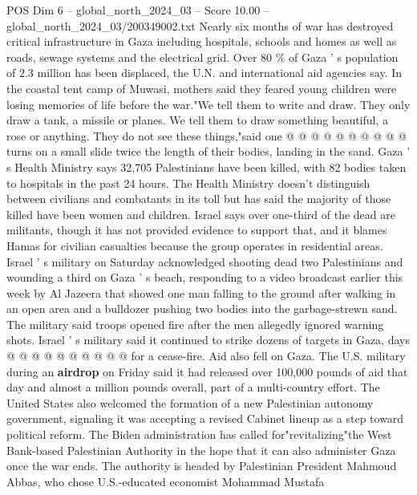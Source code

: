 \begin{textsample}{POS Dim 6 – global\_north\_2024\_03 – Score 10.00 – global\_north\_2024\_03/200349002.txt}
Nearly six months of war has destroyed critical infrastructure in Gaza including hospitals, schools and homes as well as roads, sewage systems and the electrical grid.
Over 80 \% of Gaza ' s population of 2.3 million has been displaced, the U.N. and international aid agencies say.
In the coastal tent camp of Muwasi, mothers said they feared young children were losing memories of life before the war."We tell them to write and draw.
They only draw a tank, a missile or planes.
We tell them to draw something beautiful, a rose or anything.
They do not see these things,"said one @ @ @ @ @ @ @ @ @ @ turns on a small slide twice the length of their bodies, landing in the sand.
Gaza ' s Health Ministry says 32,705 Palestinians have been killed, with 82 bodies taken to hospitals in the past 24 hours.
The Health Ministry doesn't distinguish between civilians and combatants in its toll but has said the majority of those killed have been women and children.
Israel says over one-third of the dead are militants, though it has not provided evidence to support that, and it blames Hamas for civilian casualties because the group operates in residential areas.
Israel ' s military on Saturday acknowledged shooting dead two Palestinians and wounding a third on Gaza ' s beach, responding to a video broadcast earlier this week by Al Jazeera that showed one man falling to the ground after walking in an open area and a bulldozer pushing two bodies into the garbage-strewn sand.
The military said troops opened fire after the men allegedly ignored warning shots.
Israel ' s military said it continued to strike dozens of targets in Gaza, days @ @ @ @ @ @ @ @ @ @ for a cease-fire.
Aid also fell on Gaza.
The U.S. military during an \textbf{airdrop} on Friday said it had released over 100,000 pounds of aid that day and almost a million pounds overall, part of a multi-country effort.
The United States also welcomed the formation of a new Palestinian autonomy government, signaling it was accepting a revised Cabinet lineup as a step toward political reform.
The Biden administration has called for"revitalizing"the West Bank-based Palestinian Authority in the hope that it can also administer Gaza once the war ends.
The authority is headed by Palestinian President Mahmoud Abbas, who chose U.S.-educated economist Mohammad Mustafa

\end{textsample}
